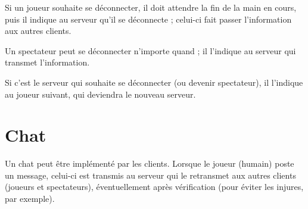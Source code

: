 \documentclass[a4paper]{article}
\begin{document}
Si un joueur souhaite se déconnecter, il doit attendre la fin de la main en cours, puis il indique au serveur qu'il se déconnecte ; celui-ci fait passer l'information aux autres clients.

Un spectateur peut se déconnecter n'importe quand ; il l'indique au serveur qui transmet l'information.

Si c'est le serveur qui souhaite se déconnecter (ou devenir spectateur), il l'indique au joueur suivant, qui deviendra le nouveau serveur.

\section{Chat}

Un chat peut être implémenté par les clients.
Lorsque le joueur (humain) poste un message, celui-ci est transmis au serveur qui le retransmet aux autres clients (joueurs et spectateurs), éventuellement après vérification (pour éviter les injures, par exemple).
\end{document}
